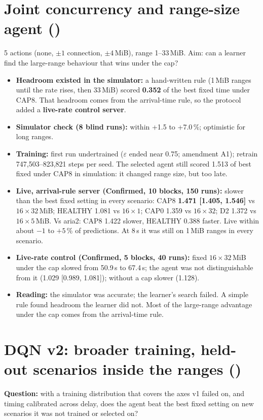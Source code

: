\section{Joint concurrency and range-size agent ()}
5 actions (none, $\pm1$ connection, $\pm4$\,MiB), range 1--33\,MiB. Aim: can a learner find the large-range behaviour that wins under the cap?
\begin{itemize}
\item \textbf{Headroom existed in the simulator:} a hand-written rule (1\,MiB ranges until the rate rises, then 33\,MiB) scored \textbf{0.352} of the best fixed time under CAP8. That headroom comes from the arrival-time rule, so the protocol added a \textbf{live-rate control server}.
\item \textbf{Simulator check (8 blind runs):} within +1.5 to +7.0\,\%; optimistic for long ranges.
\item \textbf{Training:} first run undertrained ($\varepsilon$ ended near 0.75; amendment A1); retrain 747{,}503--823{,}821 steps per seed. The selected agent still scored 1.513 of best fixed under CAP8 in simulation: it changed range size, but too late.
\item \textbf{Live, arrival-rule server (Confirmed, 10 blocks, 150 runs):} slower than the best fixed setting in every scenario: CAP8 \textbf{1.471 [1.405, 1.546]} vs $16\times32$\,MiB; HEALTHY 1.081 vs $16\times1$; CAP0 1.359 vs $16\times32$; D2 1.372 vs $16\times5$\,MiB. Vs aria2: CAP8 1.422 slower, HEALTHY 0.388 faster. Live within about $-1$ to $+5$\,\% of predictions. At 8\,s it was still on 1\,MiB ranges in every scenario.
\item \textbf{Live-rate control (Confirmed, 5 blocks, 40 runs):} fixed $16\times32$\,MiB under the cap slowed from 50.9\,s to 67.4\,s; the agent was not distinguishable from it (1.029 [0.989, 1.081]); without a cap slower (1.128).
\item \textbf{Reading:} the simulator was accurate; the learner's search failed. A simple rule found headroom the learner did not. Most of the large-range advantage under the cap comes from the arrival-time rule.
\end{itemize}

\section{DQN v2: broader training, held-out scenarios inside the ranges ()}
\textbf{Question:} with a training distribution that covers the axes v1 failed on, and timing calibrated across delay, does the agent beat the best fixed setting on new scenarios it was not trained or selected on?

